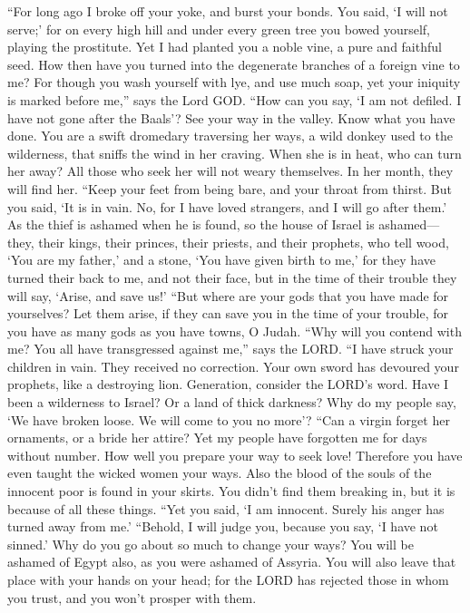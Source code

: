  ``For long ago I broke off your yoke, and burst your
bonds. You said, `I will not serve;' for on every high hill and under
every green tree you bowed yourself, playing the prostitute.
 Yet I had planted you a noble vine, a pure and faithful
seed. How then have you turned into the degenerate branches of a foreign
vine to me?  For though you wash yourself with lye, and use
much soap, yet your iniquity is marked before me,'' says the Lord GOD.
 ``How can you say, `I am not defiled. I have not gone
after the Baals'? See your way in the valley. Know what you have done.
You are a swift dromedary traversing her ways,  a wild
donkey used to the wilderness, that sniffs the wind in her craving. When
she is in heat, who can turn her away? All those who seek her will not
weary themselves. In her month, they will find her.  ``Keep
your feet from being bare, and your throat from thirst. But you said,
`It is in vain. No, for I have loved strangers, and I will go after
them.'  As the thief is ashamed when he is found, so the
house of Israel is ashamed--- they, their kings, their princes, their
priests, and their prophets,  who tell wood, `You are my
father,' and a stone, `You have given birth to me,' for they have turned
their back to me, and not their face, but in the time of their trouble
they will say, `Arise, and save us!'  ``But where are your
gods that you have made for yourselves? Let them arise, if they can save
you in the time of your trouble, for you have as many gods as you have
towns, O Judah.  ``Why will you contend with me? You all
have transgressed against me,'' says the LORD.  ``I have
struck your children in vain. They received no correction. Your own
sword has devoured your prophets, like a destroying lion. 
Generation, consider the LORD's word. Have I been a wilderness to
Israel? Or a land of thick darkness? Why do my people say, `We have
broken loose. We will come to you no more'?  ``Can a virgin
forget her ornaments, or a bride her attire? Yet my people have
forgotten me for days without number.  How well you prepare
your way to seek love! Therefore you have even taught the wicked women
your ways.  Also the blood of the souls of the innocent
poor is found in your skirts. You didn't find them breaking in, but it
is because of all these things.  ``Yet you said, `I am
innocent. Surely his anger has turned away from me.' ``Behold, I will
judge you, because you say, `I have not sinned.'  Why do
you go about so much to change your ways? You will be ashamed of Egypt
also, as you were ashamed of Assyria.  You will also leave
that place with your hands on your head; for the LORD has rejected those
in whom you trust, and you won't prosper with them.

